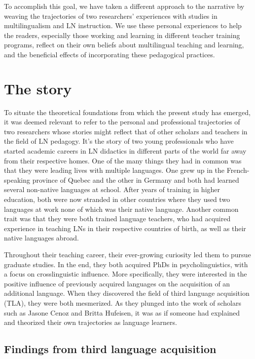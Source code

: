 \documentclass[output=paper]{../langscibook}
\begin{document}
To accomplish this goal, we have taken a different approach to the narrative by weaving the trajectories of two researchers’ experiences with studies in multilingualism and LN instruction. We use these personal experiences to help the readers, especially those working and learning in different teacher training programs, reflect on their own beliefs about multilingual teaching and learning, and the beneficial effects of incorporating these pedagogical practices.


\section{The story}


To situate the theoretical foundations from which the present study has emerged, it was deemed relevant to refer to the personal and professional trajectories of two researchers whose stories might reflect that of other scholars and teachers in the field of LN pedagogy. It’s the story of two young professionals who have started academic careers in LN didactics in different parts of the world far away from their respective homes. One of the many things they had in common was that they were leading lives with multiple languages. One grew up in the French-speaking province of Quebec and the other in Germany and both had learned several non-native languages at school. After years of training in higher education, both were now stranded in other countries where they used two languages at work none of which was their native language. Another common trait was that they were both trained language teachers, who had acquired experience in teaching LNs in their respective countries of birth, as well as their native languages abroad. 

Throughout their teaching career, their ever-growing curiosity led them to pursue graduate studies. In the end, they both acquired PhDs in psycholinguistics, with a focus on crosslinguistic influence. More specifically, they were interested in the positive influence of previously acquired languages on the acquisition of an additional language. When they discovered the field of third language acquisition (TLA), they were both mesmerized. As they plunged into the work of scholars such as Jasone Cenoz and Britta Hufeisen, it was as if someone had explained and theorized their own trajectories as language learners.



\subsection{Findings from third language acquisition}
\end{document}
